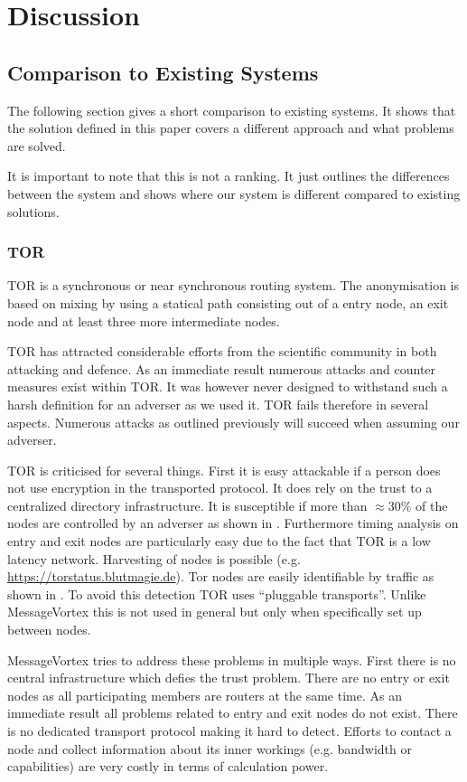 \documentclass[9pt,journal,compsoc]{IEEEtran}
\begin{document}
\section{Discussion}

\subsection{Comparison to Existing Systems}
The following section gives a short comparison to existing systems. It shows that the solution defined in this paper covers a different approach and what problems are solved. 

It is important to note that this is not a ranking. It just outlines the differences between the system and shows where our system is different compared to existing solutions.

\subsubsection{TOR}
TOR\cite{tor-spec} is a synchronous or near synchronous routing system. The anonymisation is based on mixing by using a statical path consisting out of a entry node, an exit node and at least three more intermediate nodes.

TOR has attracted considerable efforts from the scientific community in both attacking and defence. As an immediate result numerous attacks and counter measures exist within TOR. It was however never designed to withstand such a harsh definition for an adverser as we used it. TOR fails therefore in several aspects. Numerous attacks as outlined previously will succeed when assuming our adverser. 

TOR is criticised for several things. First it is easy attackable if a person does not use encryption in the transported protocol. It does rely on the trust to a centralized directory infrastructure. It is susceptible if more than $\approx 30\%$ of the nodes are controlled by an adverser as shown in \cite{jansen2014sniper}. Furthermore timing analysis on entry and exit nodes are particularly easy due to the fact that TOR is a low latency network\cite{torta05,esorics10-bandwidth}. Harvesting of nodes is possible (e.g. \url{https://torstatus.blutmagie.de}). Tor nodes are easily identifiable by traffic as shown in \cite{foci12-winter}. To avoid this detection TOR uses ``pluggable transports''. Unlike MessageVortex this is not used in general but only when specifically set up between nodes.

MessageVortex tries to address these problems in multiple ways. First there is no central infrastructure which defies the trust problem. There are no entry or exit nodes as all participating members are routers at the same time. As an immediate result all problems related to entry and exit nodes do not exist. There is no dedicated transport protocol making it hard to detect. Efforts to contact a node and collect information about its inner workings (e.g. bandwidth or capabilities) are very costly in terms of calculation power. 
\end{document}
